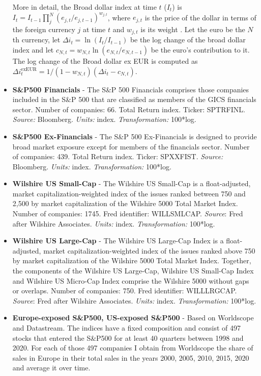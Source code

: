 \documentclass[a4paper,12pt]{article}
\begin{document}
\begin{itemize}
More in detail, the Broad dollar index at time $t$ ($I_t$) is $I_t = I_{t-1} \prod_j^N (e_{j,t}/e_{j,t-1})^{w_{j,t}}$, where $e_{j,t}$ is the price of the dollar in terms of the foreign currency $j$ at time $t$ and $w_{j,t}$ is its weight \citep{Beschwitz_etal_2019}. Let the euro be the $N$th currency, let $\Delta i_t = \ln(I_t/I_{t-1})$ be the log change of the broad dollar index and let $c_{N,t} = w_{N,t}\ln (e_{N,t}/e_{N,t-1})$ be the euro's contribution to it. The log change of the Broad dollar ex EUR is computed as $\Delta i_t^\text{exEUR} = 1/(1-w_{N,t}) (\Delta i_t - c_{N,t})$.
\item
\textbf{S\&P500 Financials} - The S\&P 500 Financials comprises those companies included in the S\&P 500 that are classified as members of the GICS financials sector. Number of companies: 66. Total Return index. Ticker: SPTRFINL.
\emph{Source:} Bloomberg. \emph{Units:} index. \emph{Transformation:} 100*log.
\item
\textbf{S\&P500 Ex-Financials} - The S\&P 500 Ex-Financials is designed to provide broad market exposure except for members of the financials sector.
Number of companies: 439. Total Return index. Ticker: SPXXFIST.
\emph{Source:} Bloomberg. \emph{Units:} index. \emph{Transformation:} 100*log.
\item
\textbf{Wilshire US Small-Cap} - The Wilshire US Small-Cap is a float-adjusted, market capitalization-weighted index of the issues ranked between 750 and 2,500 by market capitalization of the Wilshire 5000 Total Market Index.
 Number of companies: 1745. Fred identifier: WILLSMLCAP.  \emph{Source}: Fred after Wilshire Associates. \emph{Units:} index. \emph{Transformation:} 100*log.
\item
\textbf{Wilshire US Large-Cap} - The Wilshire US Large-Cap Index is a float-adjusted, market capitalization-weighted index of the issues ranked above 750 by market capitalization of the Wilshire 5000 Total Market Index. Together, the components of the Wilshire US Large-Cap, Wilshire US Small-Cap Index and Wilshire US Micro-Cap Index comprise the Wilshire 5000 without gaps or overlaps. Number of companies: 750. Fred identifier: WILLLRGCAP. \emph{Source}: Fred after Wilshire Associates. \emph{Units:} index. \emph{Transformation:} 100*log.
\item
\textbf{Europe-exposed S\&P500, US-exposed S\&P500} - Based on Worldscope and Datastream.
The indices have a fixed composition and consist of 497 stocks that entered the S\&P500 for at least 40 quarters between 1998 and 2020.
For each of those 497 companies I obtain from Worldscope the share of sales in Europe in their total sales in the years 2000, 2005, 2010, 2015, 2020 and average it over time.

\end{itemize}
\end{document}
